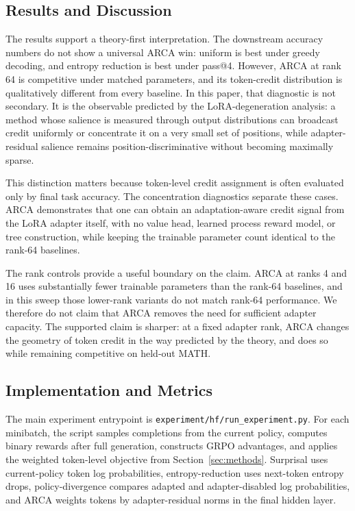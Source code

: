 \subsection{Results and Discussion}

The results support a theory-first interpretation. The downstream accuracy
numbers do not show a universal ARCA win: uniform is best under greedy
decoding, and entropy reduction is best under pass@4. However, ARCA at rank
64 is competitive under matched parameters, and its token-credit distribution
is qualitatively different from every baseline. In this paper, that diagnostic
is not secondary. It is the observable predicted by the LoRA-degeneration
analysis: a method whose salience is measured through output distributions
can broadcast credit uniformly or concentrate it on a very small set of
positions, while adapter-residual salience remains position-discriminative
without becoming maximally sparse.

This distinction matters because token-level credit assignment is often
evaluated only by final task accuracy. The concentration diagnostics separate these cases.
ARCA demonstrates that one can obtain an adaptation-aware credit signal from
the LoRA adapter itself, with no value head, learned process reward model, or tree
construction, while keeping the trainable parameter count identical to the
rank-64 baselines.

The rank controls provide a useful boundary on the claim. ARCA at ranks 4 and
16 uses substantially fewer trainable parameters than the rank-64 baselines,
and in this sweep those lower-rank variants do not match rank-64 performance.
We therefore do not claim that ARCA removes the need for sufficient adapter
capacity. The supported claim is sharper: at a fixed adapter rank, ARCA
changes the geometry of token credit in the way predicted by the theory, and
does so while remaining competitive on held-out MATH.

\subsection{Implementation and Metrics}

The main experiment entrypoint is \texttt{experiment/hf/run\_experiment.py}.
For each minibatch, the script samples completions from the current policy,
computes binary rewards after full generation, constructs GRPO advantages,
and applies the weighted token-level objective from
Section~\ref{sec:methods}. Surprisal uses current-policy token log
probabilities, entropy-reduction uses next-token entropy drops,
policy-divergence compares adapted and adapter-disabled log probabilities,
and ARCA weights tokens by adapter-residual norms in the final hidden layer.

